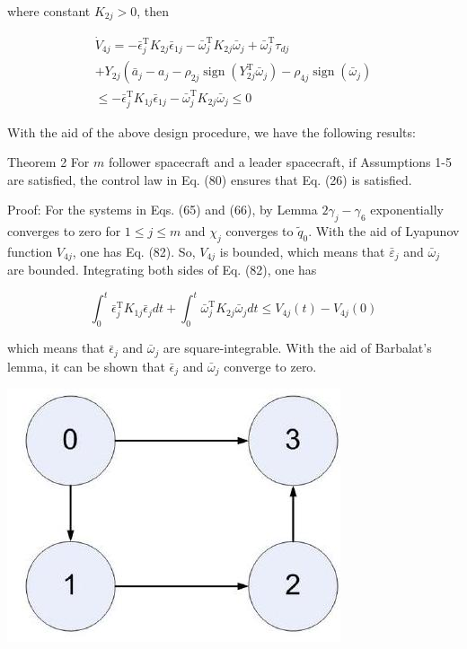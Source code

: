 \documentclass[10pt]{article}
\begin{document}
where constant $K_{2 j}>0$, then

$$
\begin{gathered}
\dot{V}_{4 j}=-\bar{\epsilon}_{j}^{\mathrm{T}} K_{2 j} \bar{\epsilon}_{1 j}-\bar{\omega}_{j}^{\mathrm{T}} K_{2 j} \bar{\omega}_{j}+\bar{\omega}_{j}^{\mathrm{T}} \tau_{d j} \\
+Y_{2 j}\left(\bar{a}_{j}-a_{j}-\rho_{2 j} \operatorname{sign}\left(Y_{2 j}^{\mathrm{T}} \bar{\omega}_{j}\right)-\rho_{4 j} \operatorname{sign}\left(\bar{\omega}_{j}\right)\right. \\
\leq-\bar{\epsilon}_{j}^{\mathrm{T}} K_{1 j} \bar{\epsilon}_{1 j}-\bar{\omega}_{j}^{\mathrm{T}} K_{2 j} \bar{\omega}_{j} \leq 0
\end{gathered}
$$

With the aid of the above design procedure, we have the following results:

Theorem 2 For $m$ follower spacecraft and a leader spacecraft, if Assumptions 1-5 are satisfied, the control law in Eq. (80) ensures that Eq. (26) is satisfied.

Proof: For the systems in Eqs. (65) and (66), by Lemma $2 \gamma_{j}-\gamma_{6}$ exponentially converges to zero for $1 \leq j \leq m$ and $\chi_{j}$ converges to $\tilde{q}_{0}$. With the aid of Lyapunov function $V_{4 j}$, one has Eq. (82). So, $V_{4 j}$ is bounded, which means that $\bar{\varepsilon}_{j}$ and $\bar{\omega}_{j}$ are bounded. Integrating both sides of Eq. (82), one has

$$
\int_{0}^{t} \bar{\epsilon}_{j}^{\mathrm{T}} K_{1 j} \bar{\epsilon}_{j} d t+\int_{0}^{t} \bar{\omega}_{j}^{\mathrm{T}} K_{2 j} \bar{\omega}_{j} d t \leq V_{4 j}(t)-V_{4 j}(0)
$$

which means that $\bar{\epsilon}_{j}$ and $\bar{\omega}_{j}$ are square-integrable. With the aid of Barbalat's lemma, it can be shown that $\bar{\epsilon}_{j}$ and $\bar{\omega}_{j}$ converge to zero.

\begin{center}
\includegraphics[max width=\textwidth]{2023_10_07_a50fd94fd281fe9896c1g-07(1)}
\end{center}
\end{document}
